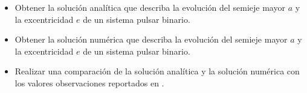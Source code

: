 \begin{itemize}
    \item Obtener la solución analítica que describa la evolución del semieje mayor $a$ y la excentricidad $e$ de un sistema pulsar binario.
    \item Obtener la solución numérica que describa la evolución del semieje mayor $a$ y la excentricidad $e$ de un sistema pulsar binario.
    \item Realizar una comparación de la solución analítica y la solución numérica con los valores observaciones reportados en \cite{Weisberg2010}.
\end{itemize}